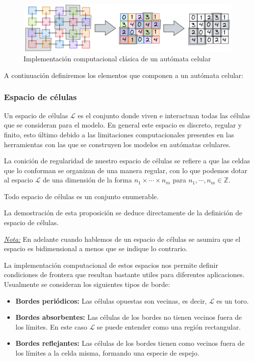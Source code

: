 \begin{figure}[h]
  \centering
    \includegraphics[width=1\textwidth]{Imagenes/ACaMatriz.PNG}
  \caption{Implementación computacional clásica de un autómata celular}
  \label{fig:AC a matriz}
\end{figure}

A continuación definiremos los elementos que componen a un autómata celular:

\subsubsection{Espacio de células}

Un espacio de células $\mathcal{L}$ es el conjunto donde viven e interactuan todas las células que se consideran para el modelo. En general este espacio es discreto, regular y finito, esto último debido a las limitaciones computacionales presentes en las herramientas con las que se construyen los modelos en autómatas celulares.

La conición de regularidad de nuestro espacio de células se refiere a que las celdas que lo conforman se organizan de una manera regular, con lo que podemos dotar al espacio $\mathcal{L}$ de una dimensión de la forma $n_1\times\cdots\times n_m$ para $n_1,\cdots,n_m\in\mathbb{Z}$.

\begin{proposicion}\label{pro:LEsEnumerable}
Todo espacio de células es un conjunto enumerable.
\end{proposicion}

La demostración de esta proposición se deduce directamente de la definición de espacio de células.

\underline{\textit{Nota:}} En adelante cuando hablemos de un espacio de células se asumira que el espacio es bidimensional a menos que se indique lo contrario.

La implementación computacional de estos espacios nos permite definir condiciones de frontera que resultan bastante utiles para diferentes aplicaciones. Usualmente se consideran los siguientes tipos de borde:

\begin{itemize}
    \item \textbf{Bordes periódicos:} Las células opuestas son vecinas, es decir, $\mathcal{L}$ es un toro.
    \item \textbf{Bordes absorbentes:} Las células de los bordes no tienen vecinos fuera de los límites. En este caso $\mathcal{L}$ se puede entender como una región rectangular.
    \item \textbf{Bordes reflejantes:} Las células de los bordes tienen como vecinos fuera de los límites a la celda misma, formando una especie de espejo.
\end{itemize}

